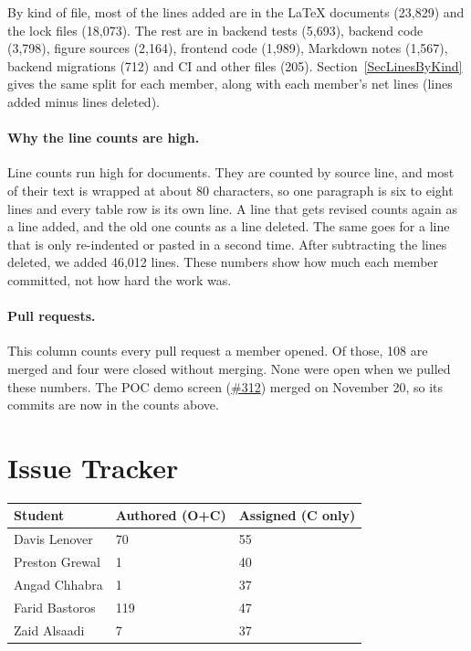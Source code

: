 \documentclass{article}
\begin{document}
By kind of file, most of the lines added are in the \LaTeX{} documents
(23,829) and the lock files (18,073). The rest are in backend tests (5,693),
backend code (3,798), figure sources (2,164), frontend code (1,989), Markdown
notes (1,567), backend migrations (712) and CI and other files (205).
Section~\ref{SecLinesByKind} gives the same split for each member, along with
each member's net lines (lines added minus lines deleted).

\paragraph{Why the line counts are high.} Line counts run high for documents.
They are counted by source line, and most of their text is wrapped at about 80
characters, so one paragraph is six to eight lines and every table row is its
own line. A line that gets revised counts again as a line added, and the old
one counts as a line deleted. The same goes for a line that is only
re-indented or pasted in a second time. After subtracting the lines deleted,
we added 46,012 lines. These numbers show how much each member committed, not
how hard the work was.

\paragraph{Pull requests.} This column counts every pull request a member
opened. Of those, 108 are merged and four were closed without merging. None
were open when we pulled these numbers. The POC demo screen
(\href{https://github.com/davislenover/BurnNEarn/pull/312}{\#312}) merged on
November 20, so its commits are now in the counts above.

\section{Issue Tracker}


\begin{table}[H]
\centering
\begin{tabular}{lll}
\toprule
\textbf{Student} & \textbf{Authored (O+C)} & \textbf{Assigned (C only)}\\
\midrule
Davis Lenover & 70 & 55 \\
Preston Grewal & 1 & 40 \\
Angad Chhabra & 1 & 37 \\
Farid Bastoros & 119 & 47 \\
Zaid Alsaadi & 7 & 37 \\
\bottomrule
\end{tabular}
\end{table}
\end{document}
